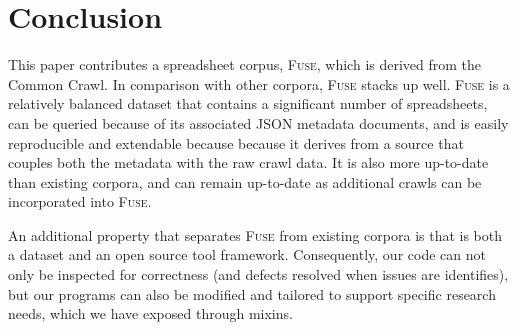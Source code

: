 \documentclass[conference]{IEEEtran}
\begin{document}






\section{Conclusion}

This paper contributes a spreadsheet corpus, \textsc{Fuse}, which is derived from the Common Crawl. In comparison with other corpora, \textsc{Fuse} stacks up well. \textsc{Fuse} is a relatively balanced dataset that contains a significant number of spreadsheets, can be queried because of its associated JSON metadata documents, and is easily reproducible and extendable because because it derives from a source that couples both the metadata with the raw crawl data. It is also more up-to-date than existing corpora, and can remain up-to-date as additional crawls can be incorporated into \textsc{Fuse}.

An additional property that separates \textsc{Fuse} from existing corpora is that is both a dataset and an open source tool framework. Consequently, our code can not only be inspected for correctness (and defects resolved when issues are identifies), but our programs can also be modified and tailored to support specific research needs, which we have exposed through mixins.
\end{document}
